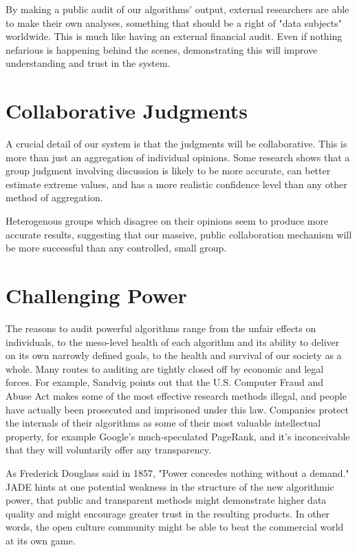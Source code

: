 \documentclass{sigchi-ext}
\begin{document}
By making a public audit of our algorithms' output, external researchers are able to make their own analyses, something that should be a right of "data subjects" worldwide.  This is much like having an external financial audit.  Even if nothing nefarious is happening behind the scenes, demonstrating this will improve understanding and trust in the system.\cite{sandvig2014auditing}

\section{Collaborative Judgments}

A crucial detail of our system is that the judgments will be collaborative.  This is more than just an aggregation of individual opinions.  Some research shows that a group judgment involving discussion is likely to be more accurate, can better estimate extreme values, and has a more realistic confidence level than any other method of aggregation.\cite{sniezek1989accuracy}

Heterogenous groups which disagree on their opinions seem to produce more accurate results, suggesting that our massive, public collaboration mechanism will be more successful than any controlled, small group.\cite{schulz2006group}

\section{Challenging Power}

The reasons to audit powerful algorithms range from the unfair effects on individuals, to the meso-level health of each algorithm and its ability to deliver on its own narrowly defined goals, to the health and survival of our society as a whole.  Many routes to auditing are tightly closed off by economic and legal forces.  For example, Sandvig points out that the U.S. Computer Fraud and Abuse Act makes some of the most effective research methods illegal, and people have actually been prosecuted and imprisoned under this law.  Companies protect the internals of their algorithms as some of their most valuable intellectual property, for example Google's much-speculated PageRank, and it's inconceivable that they will voluntarily offer any transparency.

As Frederick Douglass said in 1857, "Power concedes nothing without a demand."  JADE hints at one potential weakness in the structure of the new algorithmic power, that public and transparent methods might demonstrate higher data quality and might encourage greater trust in the resulting products.  In other words, the open culture community might be able to beat the commercial world at its own game.
\end{document}
